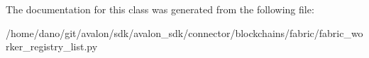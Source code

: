 The documentation for this class was generated from the following file\+:\begin{DoxyCompactItemize}
\item 
/home/dano/git/avalon/sdk/avalon\+\_\+sdk/connector/blockchains/fabric/fabric\+\_\+worker\+\_\+registry\+\_\+list.\+py\end{DoxyCompactItemize}
